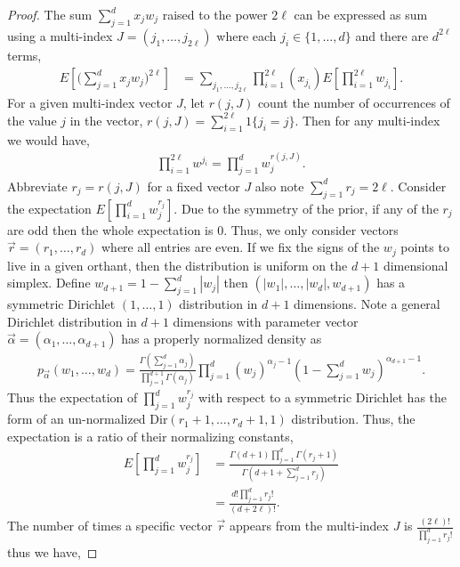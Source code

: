 \documentclass{article}
\numberwithin{equation}{section}
\theoremstyle{Lemma}
\theoremstyle{Corollary}
\theoremstyle{Theorem}
\theoremstyle{Remark}
\begin{document}
\begin{proof}
The sum $\sum_{j=1}^{d}x_{j}w_{j}$ raised to the power $2\ell$ can be expressed as sum using a multi-index $J = (j_{1}, \ldots, j_{2\ell})$ where each $j_{i} \in \{1, \ldots, d\}$ and there are $d^{2\ell}$ terms,
\begin{align}
    E[\Big(\sum_{j=1}^{d}x_{j}w_{j} \Big)^{2\ell}]&= \sum_{j_{1},\ldots,j_{2\ell} }\prod_{i=1}^{2\ell}(x_{j_{i}})E[\prod_{i=1}^{2\ell}w_{j_{i}}].
\end{align}
For a given multi-index vector $J$, let $r(j, J)$ count the number of occurrences of the value $j$ in the vector, $r(j, J)= \sum_{i=1}^{2\ell}1\{j_{i} = j\}$. Then for any multi-index we would have,
\begin{align}
    \prod_{i=1}^{2\ell}w^{j_{i}} = \prod_{j=1}^{d}w_{j}^{r(j, J)}.
\end{align}
Abbreviate $r_{j} = r(j, J)$ for a fixed vector $J$ also note $\sum_{j=1}^{d}r_{j} = 2\ell$. Consider the expectation $E[\prod_{i=1}^{d}w_{j}^{r_{j}}]$. Due to the symmetry of the prior, if any of the $r_{j}$ are odd then the whole expectation is 0. Thus, we only consider vectors $\vec{r} = (r_{1}, \ldots, r_{d})$ where all entries are even.
If we fix the signs of the $w_{j}$ points to live in a given orthant, then the distribution is uniform on the $d+1$ dimensional simplex. Define $w_{d+1} = 1-\sum_{j=1}^{d}|w_{j}|$ then $(|w_{1}|, \ldots, |w_{d}|, w_{d+1})$ has a symmetric Dirichlet $(1, \ldots, 1)$ distribution in $d+1$ dimensions. Note a general Dirichlet distribution in $d+1$ dimensions with parameter vector $\vec{\alpha}=(\alpha_{1}, \ldots, \alpha_{d+1})$ has a properly normalized density as
\begin{align}
    p_{\vec{\alpha}}(w_{1}, \ldots, w_{d})=\frac{\Gamma(\sum_{j=1}^{d}\alpha_{j})}{\prod_{j=1}^{d+1}\Gamma(\alpha_{j})}\prod_{j=1}^{d}(w_{j})^{\alpha_{j}-1}(1-\sum_{j=1}^{d}w_{j})^{\alpha_{d+1}-1}.
\end{align}
Thus the expectation of $\prod_{j=1}^{d}w_{j}^{r_{j}}$ with respect to a symmetric Dirichlet has the form of an un-normalized $\text{Dir}(r_{1}+1, \ldots, r_{d}+1, 1)$ distribution. Thus, the expectation is a ratio of their normalizing constants,
\begin{align}
    E[\prod_{j=1}^{d}w_{j}^{r_{j}}]&= \frac{\Gamma(d+1)\prod_{j=1}^{d}\Gamma(r_{j}+1)}{\Gamma(d+1+\sum_{j=1}^{d}r_{j})} \label{dir_exp}\\
    &= \frac{d!\prod_{j=1}^{d}r_{j}!}{(d+2\ell)!}.
\end{align}
The number of times a specific vector $\vec{r}$ appears from the multi-index $J$ is $\frac{(2\ell)!}{\prod_{j=1}^{d}r_{j}!}$ thus we have,

\end{proof}
\end{document}

